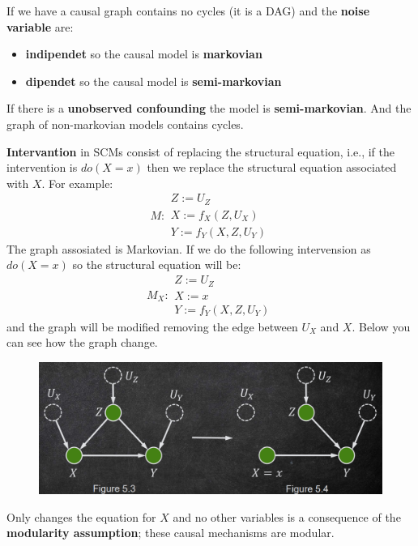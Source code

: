 If we have a causal graph contains no cycles (it is a DAG) and the \textbf{noise variable} 
are:
\begin{itemize}
    \item \textbf{indipendet} so the causal model is \textbf{markovian}
    \item \textbf{dipendet} so the causal model is \textbf{semi-markovian}
\end{itemize} 

\begin{note}
If there is a \textbf{unobserved confounding} the model is \textbf{semi-markovian}. And 
the graph of non-markovian models contains cycles.
\end{note}

\textbf{Intervantion} in SCMs consist of replacing the structural equation, i.e., if the 
intervention is $do(X = x)$ then we replace the structural equation associated with $X$.
For example:
\begin{equation}
    M : \begin{array}{l}
        Z := U_Z \\ X := f_X(Z, U_X) \\ Y:= f_Y(X, Z, U_Y)
    \end{array}
\end{equation}
The graph assosiated is Markovian. If we do the following intervension as $do(X=x)$
so the structural equation will be:
\begin{equation}
    M_X : \begin{array}{l}
        Z := U_Z \\ X := x \\ Y:= f_Y(X, Z, U_Y)
    \end{array}
\end{equation}
and the graph will be modified removing the edge between $U_X$ and $X$. Below you 
can see how the graph change.


\begin{figure}[h]
    \centering
    \includegraphics*[width=0.5 \textwidth]{img/intervention_on_structural_eq.png}
\end{figure}

Only changes the equation for $X$ and no other variables is a consequence of the \textbf{modularity
assumption}; these causal mechanisms are modular.

